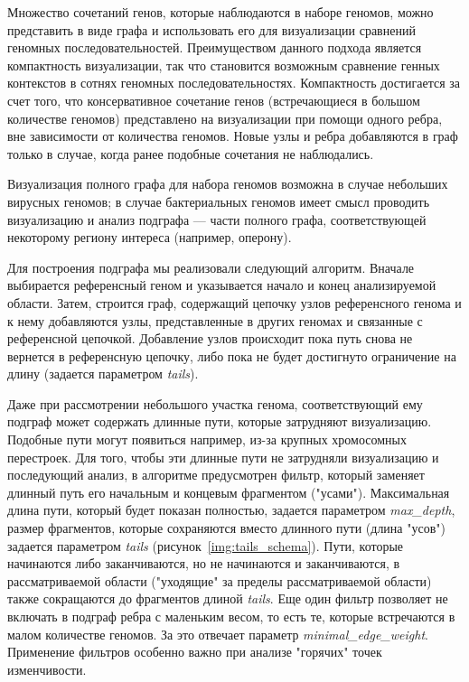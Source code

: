 Множество сочетаний генов, которые наблюдаются в наборе геномов, можно представить в виде графа и использовать его для визуализации сравнений геномных последовательностей. Преимуществом данного подхода является компактность визуализации, так что становится возможным сравнение генных контекстов в сотнях геномных последовательностях. Компактность достигается за счет того, что консервативное сочетание генов (встречающиеся в большом количестве геномов) представлено на визуализации при помощи одного ребра, вне зависимости от количества геномов. Новые узлы и ребра добавляются в граф только в случае, когда ранее подобные сочетания не наблюдались. 

Визуализация полного графа для набора геномов возможна в случае небольших вирусных геномов; в случае бактериальных геномов имеет смысл проводить визуализацию и анализ подграфа --- части полного графа, соответствующей некоторому региону интереса (например, оперону).

Для построения подграфа мы реализовали следующий алгоритм. Вначале выбирается референсный геном и указывается начало и конец анализируемой области. Затем, строится граф, содержащий цепочку узлов референсного генома и к нему добавляются узлы, представленные в других геномах и связанные с референсной цепочкой. Добавление узлов происходит пока путь снова не вернется в референсную цепочку, либо пока не будет достигнуто ограничение на длину (задается параметром \textit{tails}).

Даже при рассмотрении небольшого участка генома, соответствующий ему подграф может содержать длинные пути, которые затрудняют визуализацию. Подобные пути могут появиться например, из-за крупных хромосомных перестроек. Для того, чтобы эти длинные пути не затрудняли визуализацию и последующий анализ, в алгоритме предусмотрен фильтр, который заменяет длинный путь его начальным и концевым фрагментом ("усами"). Максимальная длина пути, который будет показан полностью, задается параметром \textit{max\_depth}, размер фрагментов, которые сохраняются вместо длинного пути (длина "усов") задается параметром \textit{tails} (рисунок~\ref{img:tails_schema}). Пути, которые начинаются либо заканчиваются, но не начинаются и заканчиваются, в рассматриваемой области ("уходящие" за пределы рассматриваемой области) также сокращаются до фрагментов длиной \textit{tails}. Еще один фильтр позволяет не включать в подграф ребра с маленьким весом, то есть те, которые встречаются в малом количестве геномов. За это отвечает параметр \textit{minimal\_edge\_weight}. Применение фильтров особенно важно при анализе "горячих" точек изменчивости.

